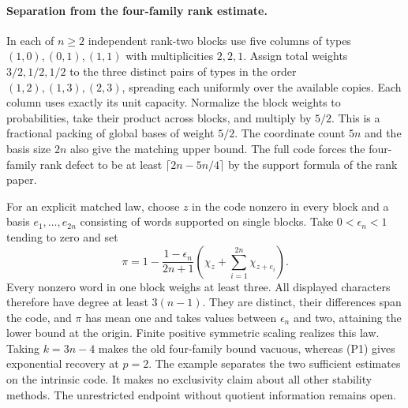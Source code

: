 \paragraph{Separation from the four-family rank estimate.}
In each of $n\ge2$ independent rank-two blocks use five columns of
types $(1,0),(0,1),(1,1)$ with multiplicities $2,2,1$. Assign total
weights $3/2,1/2,1/2$ to the three distinct pairs of types in the order
$(1,2),(1,3),(2,3)$, spreading each uniformly over the available copies.
Each column uses exactly its unit capacity. Normalize the block weights
to probabilities, take their product across blocks, and multiply by $5/2$.
This is a fractional packing of global bases of weight $5/2$.
The coordinate count $5n$ and the basis size $2n$ also give the matching
upper bound. The full code forces the four-family rank defect to be at
least $\lceil 2n-5n/4\rceil$ by the support formula of the rank paper.

For an explicit matched law, choose $z$ in the code nonzero in every block
and a basis $e_1,\ldots,e_{2n}$ consisting of words supported on single
blocks. Take $0<\epsilon_n<1$ tending to zero and set
\[
 \pi=1-\frac{1-\epsilon_n}{2n+1}
       \left(\chi_z+\sum_{i=1}^{2n}\chi_{z+e_i}\right).
\]
Every nonzero word in one block weighs at least three. All displayed
characters therefore have degree at least $3(n-1)$. They are distinct,
their differences span the code, and $\pi$ has mean one and takes values
between $\epsilon_n$ and two, attaining the lower bound at the origin.
Finite positive symmetric scaling realizes this law. Taking $k=3n-4$
makes the old four-family bound vacuous, whereas (P1) gives exponential
recovery at $p=2$. The example separates the two sufficient estimates
on the intrinsic code. It makes no exclusivity claim about all other
stability methods. The unrestricted endpoint without quotient information
remains open.
